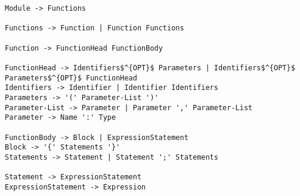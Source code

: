 \documentclass[border=5pt]{standalone}
\begin{document}
\begin{spacing}{2}
\begin{lstlisting}
Module -> Functions

Functions -> Function | Function Functions

Function -> FunctionHead FunctionBody

FunctionHead -> Identifiers$^{OPT}$ Parameters | Identifiers$^{OPT}$ Parameters$^{OPT}$ FunctionHead
Identifiers -> Identifier | Identifier Identifiers
Parameters -> '(' Parameter-List ')'
Parameter-List -> Parameter | Parameter ',' Parameter-List
Parameter -> Name ':' Type

FunctionBody -> Block | ExpressionStatement
Block -> '{' Statements '}'
Statements -> Statement | Statement ';' Statements

Statement -> ExpressionStatement
ExpressionStatement -> Expression
\end{lstlisting}
\end{spacing}
\end{document}
